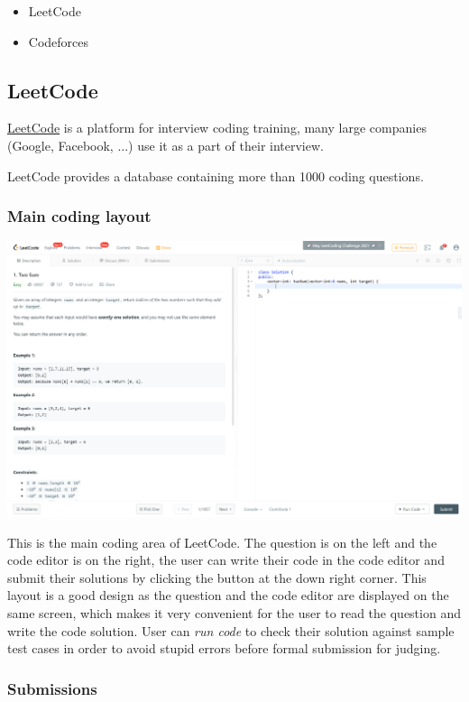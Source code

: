 \documentclass[a4paper]{report}
\begin{document}
\begin{itemize}
    \item LeetCode
    \item Codeforces
\end{itemize}

\subsection{LeetCode}

\href{https://leetcode.com/}{LeetCode} is a platform for interview coding training, many large companies (Google, Facebook, ...) use it as a part of their interview.

LeetCode provides a database containing more than 1000 coding questions.

\subsubsection{Main coding layout}
\includegraphics[width=\linewidth]{Two-Sum-LeetCode-Coding}

This is the main coding area of LeetCode. The question is on the left and the code editor is on the right, the user can write their code in the code editor and submit their solutions by clicking the button at the down right corner. This layout is a good design as the question and the code editor are displayed on the same screen, which makes it very convenient for the user to read the question and write the code solution. User can \emph{run code} to check their solution against sample test cases in order to avoid stupid errors before formal submission for judging.

\subsubsection{Submissions}
\end{document}
